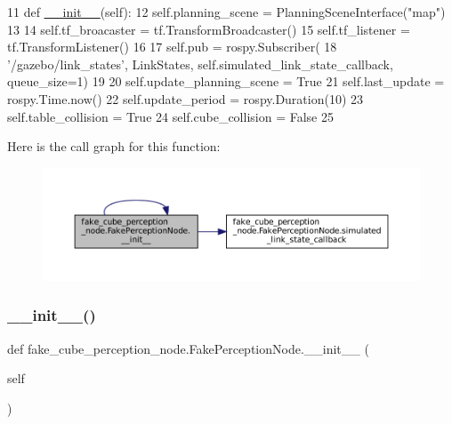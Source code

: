 \begin{DoxyCode}
11     \textcolor{keyword}{def }\hyperlink{classfake__cube__perception__node_1_1FakePerceptionNode_a6f5d90816c2222cf76bd632b5ad46457}{\_\_init\_\_}(self):
12         self.planning\_scene = PlanningSceneInterface(\textcolor{stringliteral}{"map"})
13 
14         self.tf\_broacaster = tf.TransformBroadcaster()
15         self.tf\_listener = tf.TransformListener()
16 
17         self.pub = rospy.Subscriber(
18             \textcolor{stringliteral}{'/gazebo/link\_states'}, LinkStates, self.simulated\_link\_state\_callback, queue\_size=1)
19 
20         self.update\_planning\_scene = \textcolor{keyword}{True}
21         self.last\_update = rospy.Time.now()
22         self.update\_period = rospy.Duration(10)
23         self.table\_collision = \textcolor{keyword}{True}
24         self.cube\_collision = \textcolor{keyword}{False}
25 
\end{DoxyCode}
Here is the call graph for this function\+:
\nopagebreak
\begin{figure}[H]
\begin{center}
\leavevmode
\includegraphics[width=350pt]{classfake__cube__perception__node_1_1FakePerceptionNode_a6f5d90816c2222cf76bd632b5ad46457_cgraph}
\end{center}
\end{figure}
\mbox{\label{classfake__cube__perception__node_1_1FakePerceptionNode_a6f5d90816c2222cf76bd632b5ad46457}} 
\subsubsection{\texorpdfstring{\+\_\+\+\_\+init\+\_\+\+\_\+()}{\_\_init\_\_()}\hspace{0.1cm}{\footnotesize\ttfamily [3/3]}}
{\footnotesize\ttfamily def fake\+\_\+cube\+\_\+perception\+\_\+node.\+Fake\+Perception\+Node.\+\_\+\+\_\+init\+\_\+\+\_\+ (\begin{DoxyParamCaption}\item[{}]{self }\end{DoxyParamCaption})}



